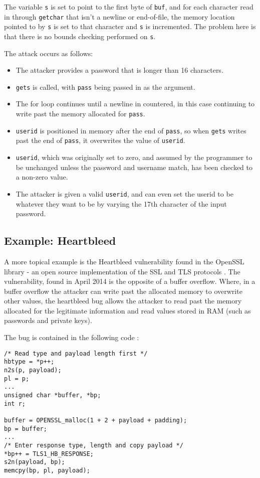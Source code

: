 The variable \verb!s! is set to point to the first byte of \verb!buf!, and for each character read in through \verb!getchar! that isn't a newline or end-of-file, the memory location pointed to by \verb!s! is set to that character and \verb!s! is incremented.
The problem here is that there is no bounds checking performed on \verb!s!.

The attack occurs as follows:

\begin{itemize}
\item The attacker provides a password that is longer than 16 characters.
\item \verb!gets! is called, with \verb!pass! being passed in as the argument.
\item The for loop continues until a newline in countered, in this case continuing to write past the memory allocated for \verb!pass!.
\item \verb!userid! is positioned in memory after the end of \verb!pass!, so when \verb!gets! writes past the end of \verb!pass!, it overwrites the value of \verb!userid!.
\item \verb!userid!, which was originally set to zero, and assumed by the programmer to be unchanged unless the password and username match, has been checked to a non-zero value.
\item The attacker is given a valid \verb!userid!, and can even set the userid to be whatever they want to be by varying the 17th character of the input password.
\end{itemize}

\subsection{Example: Heartbleed}

A more topical example is the Heartbleed vulnerability found in the OpenSSL library - an open source implementation of the SSL and TLS protocols \cite{heartbleedBlog}.
The vulnerability, found in April 2014 is the opposite of a buffer overflow.
Where, in a buffer overflow the attacker can write past the allocated memory to overwrite other values, the heartbleed bug allows the attacker to read past the memory allocated for the legitimate information and read values stored in RAM (such as passwords and private keys).

The bug is contained in the following code \cite{sslSrc}:

\begin{verbatim}
/* Read type and payload length first */
hbtype = *p++;
n2s(p, payload);
pl = p;
...
unsigned char *buffer, *bp;
int r;

buffer = OPENSSL_malloc(1 + 2 + payload + padding);
bp = buffer;
...
/* Enter response type, length and copy payload */
*bp++ = TLS1_HB_RESPONSE;
s2n(payload, bp);
memcpy(bp, pl, payload);
\end{verbatim}

